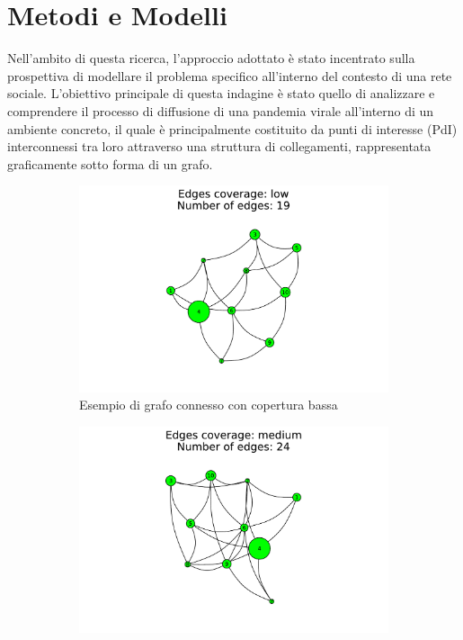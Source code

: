 \section{Metodi e Modelli}

Nell'ambito di questa ricerca, l'approccio adottato è stato incentrato 
sulla prospettiva di modellare il problema specifico all'interno del 
contesto di una rete sociale. L'obiettivo principale di questa indagine 
è stato quello di analizzare e comprendere il processo di diffusione di 
una pandemia virale all'interno di un ambiente concreto, il quale è 
principalmente costituito da punti di interesse (PdI) interconnessi tra 
loro attraverso una struttura di collegamenti, rappresentata graficamente 
sotto forma di un grafo. 

\begin{figure}[!hb]
	\centering
	\begin{subfigure}[b]{0.3\textwidth}
		\centering
		\includegraphics[width=\textwidth]{img/low.pdf}
		\caption{Esempio di grafo connesso con copertura bassa}
		\label{fig:connected_graph_example_low}
	\end{subfigure}
	\hfill
	\begin{subfigure}[b]{0.3\textwidth}
		\centering
		\includegraphics[width=\textwidth]{img/medium.pdf}

\end{subfigure}
\end{figure}
